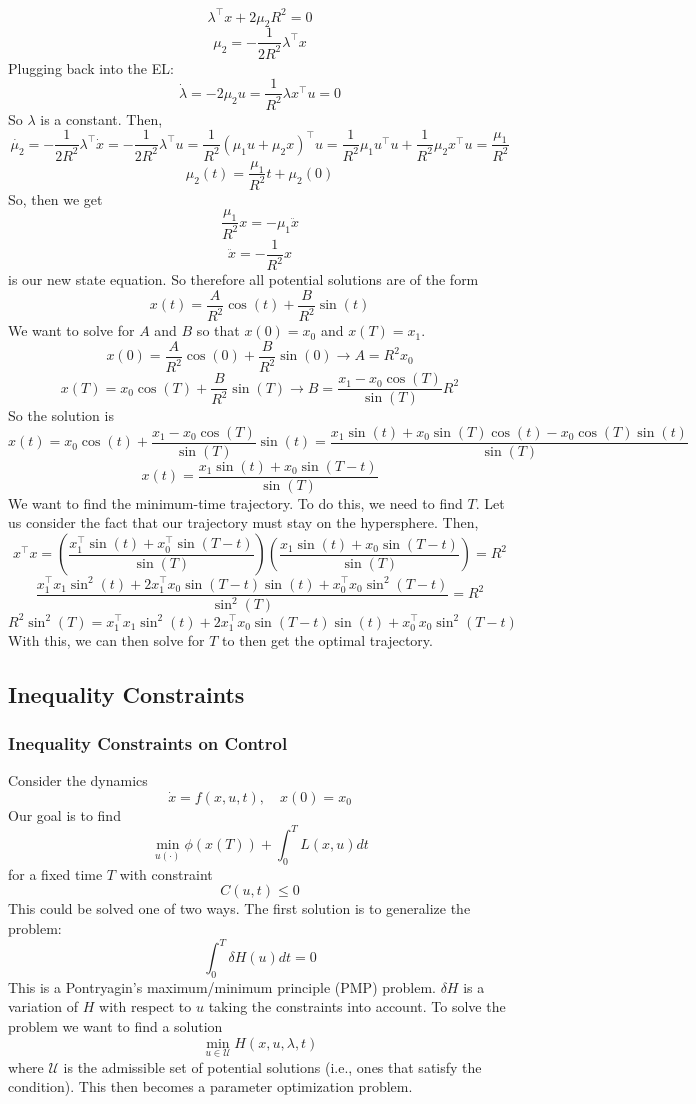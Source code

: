 \documentclass{article}
\begin{document}
\[\lambda^\top x + 2\mu_2 R^2 = 0\]
\[\mu_2 = -\frac{1}{2R^2}\lambda^\top x\]
Plugging back into the EL:
\[\dot{\lambda} = -2\mu_2 u = \frac{1}{R^2}\lambda x^\top u = 0\]
So $\lambda$ is a constant. Then,
\[\dot{\mu_2} = -\frac{1}{2R^2}\lambda^\top \dot{x} = -\frac{1}{2R^2}\lambda^\top u
= \frac{1}{R^2}(\mu_1 u + \mu_2 x)^\top u = \frac{1}{R^2}\mu_1 u^\top u +
\frac{1}{R^2}\mu_2 x^\top u = \frac{\mu_1}{R^2}\]
\[\mu_2(t) = \frac{\mu_1}{R^2} t + \mu_2(0)\]
So, then we get
\[\frac{\mu_1}{R^2} x = -\mu_1\ddot{x}\]
\[\ddot{x} = -\frac{1}{R^2}x\]
is our new state equation. So therefore all potential solutions are of the form
\[x(t) = \frac{A}{R^2}\cos(t) + \frac{B}{R^2}\sin(t)\]
We want to solve for $A$ and $B$ so that $x(0) = x_0$ and $x(T) = x_1$.
\[x(0) = \frac{A}{R^2}\cos(0) + \frac{B}{R^2}\sin(0) \rightarrow A = R^2 x_0\]
\[x(T) = x_0\cos(T) + \frac{B}{R^2}\sin(T) \rightarrow B = \frac{x_1-x_0\cos(T)}{\sin(T)}R^2\]
So the solution is
\[x(t) = x_0\cos(t) + \frac{x_1-x_0\cos(T)}{\sin(T)}\sin(t)
= \frac{x_1\sin(t)+x_0\sin(T)\cos(t)-x_0\cos(T)\sin(t)}{\sin(T)}\]
\[x(t) = \frac{x_1\sin(t) + x_0\sin(T-t)}{\sin(T)}\]
We want to find the minimum-time trajectory. To do this, we need to find $T$.
Let us consider the fact that our trajectory must stay on the hypersphere.
Then,
\[x^\top x = \left(\frac{x_1^\top\sin(t) + x_0^\top\sin(T-t)}{\sin(T)}\right)
\left(\frac{x_1\sin(t) + x_0\sin(T-t)}{\sin(T)}\right) = R^2\]
\[\frac{x_1^\top x_1\sin^2(t)+2x_1^\top x_0\sin(T-t)\sin(t)+x_0^\top x_0\sin^2(T-t)}
{\sin^2(T)} = R^2\]
\[R^2\sin^2(T) = x_1^\top x_1\sin^2(t)+2x_1^\top x_0\sin(T-t)\sin(t)+x_0^\top x_0\sin^2(T-t)\]
With this, we can then solve for $T$ to then get the optimal trajectory.

\subsection{Inequality Constraints}

\subsubsection{Inequality Constraints on Control}

\noindent
Consider the dynamics
\[\dot{x} = f(x,u,t), \quad x(0) = x_0\]
Our goal is to find
\[\min_{u(\cdot)}\phi(x(T)) + \int_{0}^{T}L(x,u)dt\]
for a fixed time $T$ with constraint
\[C(u,t) \le 0\]
This could be solved one of two ways. The first solution is to generalize the problem:
\[\int_{0}^{T}\delta H(u)dt = 0\]
This is a Pontryagin's maximum/minimum principle (PMP) problem. $\delta H$ is a variation of $H$
with respect to $u$ taking the constraints into account. To solve the problem we want to find
a solution
\[\min_{u\in\mathcal{U}}H(x,u,\lambda,t)\]
where $\mathcal{U}$ is the admissible set of potential solutions (i.e., ones that satisfy
the condition). This then becomes a parameter optimization problem.
\end{document}
